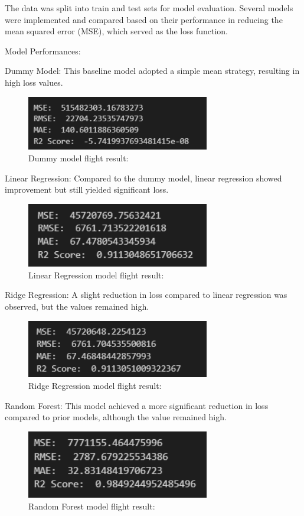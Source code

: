 \documentclass{article}
\begin{document}
The data was split into train and test sets for model evaluation. Several models were implemented and compared based on their performance in reducing the mean squared error (MSE), which served as the loss function.

Model Performances:


Dummy Model: This baseline model adopted a simple mean strategy, resulting in high loss values.
\begin{figure}[H]
    \caption{Dummy model flight result:}
    \centering
    \includegraphics[width=8cm]{imgFolder/dummyModelFlight.png}
\end{figure}

Linear Regression: Compared to the dummy model, linear regression showed improvement but still yielded significant loss.
\begin{figure}[H]
    \caption{Linear Regression model flight result:}
    \centering
    \includegraphics[width=8cm]{imgFolder/linearRegressionFlight.png}
\end{figure}

Ridge Regression: A slight reduction in loss compared to linear regression was observed, but the values remained high.
\begin{figure}[H]
    \caption{Ridge Regression model flight result:}
    \centering
    \includegraphics[width=8cm]{imgFolder/ridgeRegressionFlight.png}
\end{figure}

Random Forest: This model achieved a more significant reduction in loss compared to prior models, although the value remained high.
\begin{figure}[H]
    \caption{Random Forest model flight result:}
    \centering
    \includegraphics[width=8cm]{imgFolder/randomForestFlight.png}
\end{figure}
\end{document}
